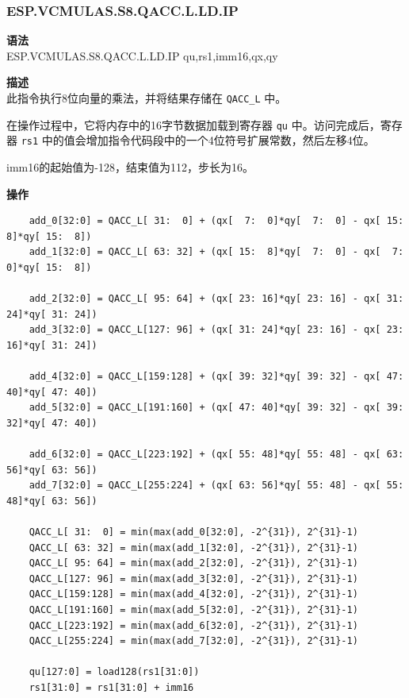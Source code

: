 \newpage
\subsubsection{ESP.VCMULAS.S8.QACC.L.LD.IP}\label{instruction:ESPVCMULASS8QACC_LLDIP}
\textbf{语法}\\
ESP.VCMULAS.S8.QACC.L.LD.IP qu,rs1,imm16,qx,qy

\textbf{描述}\\
此指令执行8位向量的乘法，并将结果存储在 \lstinline{QACC_L} 中。

在操作过程中，它将内存中的16字节数据加载到寄存器 \lstinline{qu} 中。访问完成后，寄存器 \lstinline{rs1} 中的值会增加指令代码段中的一个4位符号扩展常数，然后左移4位。

imm16的起始值为-128，结束值为112，步长为16。

\textbf{操作}\\
\begin{lstlisting}
    add_0[32:0] = QACC_L[ 31:  0] + (qx[  7:  0]*qy[  7:  0] - qx[ 15:  8]*qy[ 15:  8])
    add_1[32:0] = QACC_L[ 63: 32] + (qx[ 15:  8]*qy[  7:  0] - qx[  7:  0]*qy[ 15:  8])

    add_2[32:0] = QACC_L[ 95: 64] + (qx[ 23: 16]*qy[ 23: 16] - qx[ 31: 24]*qy[ 31: 24])
    add_3[32:0] = QACC_L[127: 96] + (qx[ 31: 24]*qy[ 23: 16] - qx[ 23: 16]*qy[ 31: 24])

    add_4[32:0] = QACC_L[159:128] + (qx[ 39: 32]*qy[ 39: 32] - qx[ 47: 40]*qy[ 47: 40])
    add_5[32:0] = QACC_L[191:160] + (qx[ 47: 40]*qy[ 39: 32] - qx[ 39: 32]*qy[ 47: 40])

    add_6[32:0] = QACC_L[223:192] + (qx[ 55: 48]*qy[ 55: 48] - qx[ 63: 56]*qy[ 63: 56])
    add_7[32:0] = QACC_L[255:224] + (qx[ 63: 56]*qy[ 55: 48] - qx[ 55: 48]*qy[ 63: 56])

    QACC_L[ 31:  0] = min(max(add_0[32:0], -2^{31}), 2^{31}-1)
    QACC_L[ 63: 32] = min(max(add_1[32:0], -2^{31}), 2^{31}-1)
    QACC_L[ 95: 64] = min(max(add_2[32:0], -2^{31}), 2^{31}-1)
    QACC_L[127: 96] = min(max(add_3[32:0], -2^{31}), 2^{31}-1)
    QACC_L[159:128] = min(max(add_4[32:0], -2^{31}), 2^{31}-1)
    QACC_L[191:160] = min(max(add_5[32:0], -2^{31}), 2^{31}-1)
    QACC_L[223:192] = min(max(add_6[32:0], -2^{31}), 2^{31}-1)
    QACC_L[255:224] = min(max(add_7[32:0], -2^{31}), 2^{31}-1)

    qu[127:0] = load128(rs1[31:0])
    rs1[31:0] = rs1[31:0] + imm16
\end{lstlisting}

